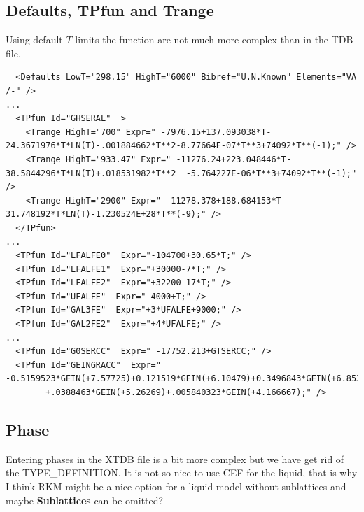 \documentclass{article}
\begin{document}
\begin{appendices}
\newpage 

\subsection{Defaults, TPfun and Trange}\label{sec:tpfuns}

Using default $T$ limits the function are not much more complex than
in the TDB file.

{\small
\begin{verbatim}
  <Defaults LowT="298.15" HighT="6000" Bibref="U.N.Known" Elements="VA /-" />
...
  <TPfun Id="GHSERAL"  >
    <Trange HighT="700" Expr=" -7976.15+137.093038*T-24.3671976*T*LN(T)-.001884662*T**2-8.77664E-07*T**3+74092*T**(-1);" />
    <Trange HighT="933.47" Expr=" -11276.24+223.048446*T-38.5844296*T*LN(T)+.018531982*T**2  -5.764227E-06*T**3+74092*T**(-1);" />
    <Trange HighT="2900" Expr=" -11278.378+188.684153*T-31.748192*T*LN(T)-1.230524E+28*T**(-9);" />
  </TPfun>
...
  <TPfun Id="LFALFE0"  Expr="-104700+30.65*T;" />
  <TPfun Id="LFALFE1"  Expr="+30000-7*T;" />
  <TPfun Id="LFALFE2"  Expr="+32200-17*T;" />
  <TPfun Id="UFALFE"  Expr="-4000+T;" />
  <TPfun Id="GAL3FE"  Expr="+3*UFALFE+9000;" />
  <TPfun Id="GAL2FE2"  Expr="+4*UFALFE;" />
...
  <TPfun Id="G0SERCC"  Expr=" -17752.213+GTSERCC;" /> 
  <TPfun Id="GEINGRACC"  Expr=" -0.5159523*GEIN(+7.57725)+0.121519*GEIN(+6.10479)+0.3496843*GEIN(+6.8533)
        +.0388463*GEIN(+5.26269)+.005840323*GEIN(+4.166667);" /> 
\end{verbatim}
}

\newpage 

\subsection{Phase}\label{sec:phaseexample}

Entering phases in the XTDB file is a bit more complex but we have get
rid of the TYPE\_DEFINITION.  It is not so nice to use CEF for the
liquid, that is why I think RKM might be a nice option for a liquid
model without sublattices and maybe {\bf Sublattices} can be omitted?


\end{appendices}
\end{document}
